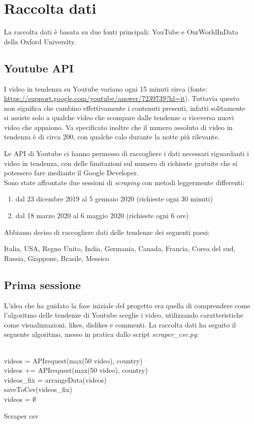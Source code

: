 \section*{Raccolta dati}
La raccolta dati è basata su due fonti principali: YouTube e OurWorldInData della Oxford University.

\subsection*{Youtube API}
I video in tendenza su Youtube variano ogni 15 minuti circa (fonte: \url{https://support.google.com/youtube/answer/7239739?hl=it}). Tuttavia questo non significa che cambino effettivamente i contenuti presenti, infatti solitamente si assiste solo a qualche video che scompare dalle tendenze o viceversa nuovi video che appaiono. Va specificato inoltre che il numero assoluto di video in tendenza è di circa 200, con qualche calo durante la notte più rilevante.

Le API di Youtube ci hanno permesso di raccogliere i dati necessari riguardanti i video in tendenza, con delle limitazioni sul numero di richieste gratuite che si potessero fare mediante il Google Developer.
\\
Sono state affrontate due sessioni di \textit{scraping} con metodi leggermente differenti:
\begin{enumerate}
	\item dal 23 dicembre 2019 al 5 gennaio 2020 (richieste ogni 30 minuti)
	\item dal 18 marzo 2020 al 6 maggio 2020 (richieste ogni 6 ore)
\end{enumerate}
Abbiamo deciso di raccogliere dati delle tendenze dei seguenti paesi:

Italia, USA, Regno Unito, India, Germania, Canada, Francia, Corea del sud, Russia, Giappone, Brasile, Messico\\

\subsection*{Prima sessione}
L'idea che ha guidato la fase iniziale del progetto era quella di comprendere come l'algoritmo delle tendenze di Youtube sceglie i video, utilizzando caratteristiche come visualizzazioni, likes, dislikes e commenti. La raccolta dati ha seguito il seguente algoritmo, messo in pratica dallo script \textit{scraper\_csv.py}:\\
\\
\begin{algorithm}[H]
	\nl {} {
	\nl {}
	{
		\nl videos = APIrequest(max(50 video), country)\\
		\nl {}
		{
			\nl videos += APIrequest(max(50 video), country) \\
		}
		\nl videos\_fix = arrangeData(videos)\\ 
		\nl saveToCsv(videos\_fix) \\
		\nl videos = $\emptyset$
	}
	}
	\caption{Scraper csv}
\end{algorithm}

